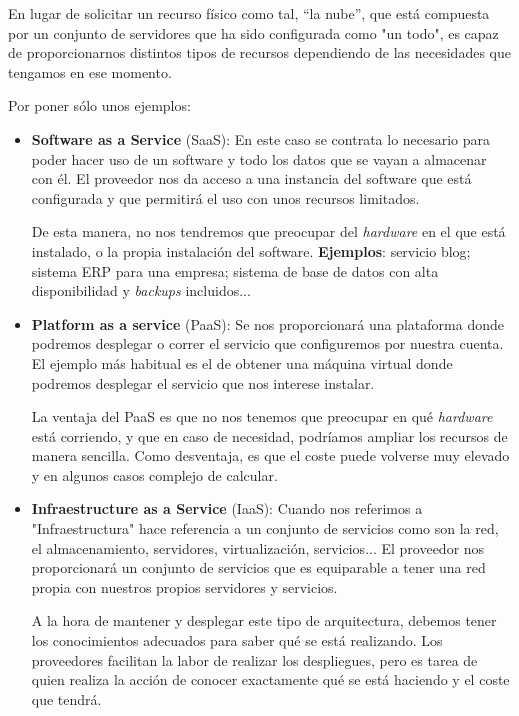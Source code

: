 En lugar de solicitar un recurso físico como tal, “la nube”, que está compuesta por un conjunto de servidores que ha sido configurada como "un todo", es capaz de proporcionarnos distintos tipos de recursos dependiendo de las necesidades que tengamos en ese momento.

Por poner sólo unos ejemplos:

\begin{itemize}
    \item \textbf{Software as a Service} (SaaS): En este caso se contrata lo necesario para poder hacer uso de un software y todo los datos que se vayan a almacenar con él. El proveedor nos da acceso a una instancia del software que está configurada y que permitirá el uso con unos recursos limitados. 
    
    De esta manera, no nos tendremos que preocupar del \textit{hardware} en el que está instalado, o la propia instalación del software. \textbf{Ejemplos}: servicio blog; sistema ERP para una empresa; sistema de base de datos con alta disponibilidad y \textit{backups} incluidos... 

    \item \textbf{Platform as a service} (PaaS): Se nos proporcionará una plataforma donde podremos desplegar o correr el servicio que configuremos por nuestra cuenta. El ejemplo más habitual es el de obtener una máquina virtual donde podremos desplegar el servicio que nos interese instalar.
    
    La ventaja del PaaS es que no nos tenemos que preocupar en qué \textit{hardware} está corriendo, y que en caso de necesidad, podríamos ampliar los recursos de manera sencilla. Como desventaja, es que el coste puede volverse muy elevado y en algunos casos complejo de calcular.
    
    \item \textbf{Infraestructure as a Service} (IaaS): Cuando nos referimos a "Infraestructura" hace referencia a un conjunto de servicios como son la red, el almacenamiento, servidores, virtualización, servicios... El proveedor nos proporcionará un conjunto de servicios que es equiparable a tener una red propia con nuestros propios servidores y servicios.
    
    A la hora de mantener y desplegar este tipo de arquitectura, debemos tener los conocimientos adecuados para saber qué se está realizando. Los proveedores facilitan la labor de realizar los despliegues, pero es tarea de quien realiza la acción de conocer exactamente qué se está haciendo y el coste que tendrá.
\end{itemize}


